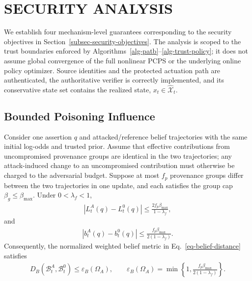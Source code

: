 \section{SECURITY ANALYSIS}
\label{sec-security-analysis}
We establish four mechanism-level guarantees corresponding to the security objectives in Section~\ref{subsec-security-objectives}. The analysis is scoped to the trust boundaries enforced by Algorithms~\ref{alg-patb}--\ref{alg-trust-policy}; it does not assume global convergence of the full nonlinear PCPS or the underlying online policy optimizer. Source identities and the protected actuation path are authenticated, the authoritative verifier is correctly implemented, and its conservative state set contains the realized state, $x_t\in\widehat{\mathcal X}_t$.

\subsection{Bounded Poisoning Influence}
\begin{theorem}
\label{thm-bounded-poisoning}
Consider one assertion $q$ and attacked/reference belief trajectories with the same initial log-odds and trusted prior. Assume that effective contributions from uncompromised provenance groups are identical in the two trajectories; any attack-induced change to an uncompromised contribution must otherwise be charged to the adversarial budget. Suppose at most $f_p$ provenance groups differ between the two trajectories in one update, and each satisfies the group cap $\beta_g\le\beta_{\max}$. Under $0<\lambda_f<1$,
\begin{align}
\label{eq-thm-logodds-bound}
|L_t^A(q)-L_t^0(q)|
\le \frac{2f_p\beta_{\max}}{1-\lambda_f},
\end{align}
and
\begin{align}
\label{eq-thm-belief-bound}
|b_t^A(q)-b_t^0(q)|
\le \frac{f_p\beta_{\max}}{2(1-\lambda_f)}.
\end{align}
Consequently, the normalized weighted belief metric in Eq.~\ref{eq-belief-distance} satisfies
\begin{align}
\label{eq-thm-global-belief-bound}
D_B(\mathcal B_t^A,\mathcal B_t^0)
\le \varepsilon_B(\Omega_A),\qquad
\varepsilon_B(\Omega_A)=
\min\left\{1,\frac{f_p\beta_{\max}}{2(1-\lambda_f)}\right\}.
\end{align}
\end{theorem}

